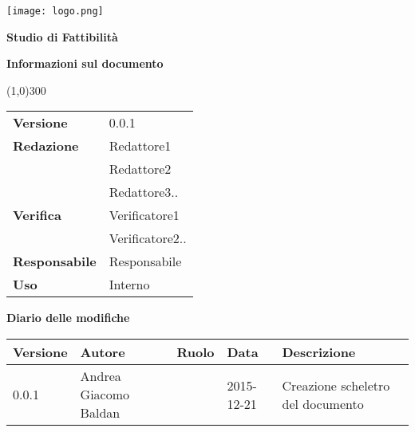 \documentclass{scalatekids-article}
\begin{document}
\begin{titlepage}
  \centering
  \texttt{[image: logo.png]}\par\vspace{1cm}
  \vspace{1.5cm}
         {\Huge\bfseries Studio di Fattibilità \par}
         \begin{center}
           \vspace{1.0cm}
                  {\large\bfseries Informazioni sul documento \par}
         \end{center}
         \vspace{-1cm}
         \begin{center}
           \line(1,0){300}
         \end{center}
         \vspace{0cm}
         \begin{tabular}[c]{l|l}
           \textbf{Versione} & 0.0.1\\
           \textbf{Redazione} & Redattore1\\ & Redattore2\\ & Redattore3..\\
           \textbf{Verifica} & Verificatore1\\ & Verificatore2..\\
           \textbf{Responsabile} & Responsabile\\
           \textbf{Uso} & Interno
         \end{tabular}
\end{titlepage}
\clearpage
\setcounter{page}{1}
\begin{flushleft}
  \vspace{0cm}
         {\large\bfseries Diario delle modifiche \par}
\end{flushleft}
\vspace{0cm}
\begin{center}
  \begin{tabular}{|l | l | l | l | l |}
    \hline
    Versione & Autore & Ruolo & Data & Descrizione \\
    \hline
    0.0.1 & Andrea Giacomo Baldan & & 2015-12-21 & Creazione scheletro del documento\\
    \hline
  \end{tabular}
\end{center}
\tableofcontents
\end{document}
